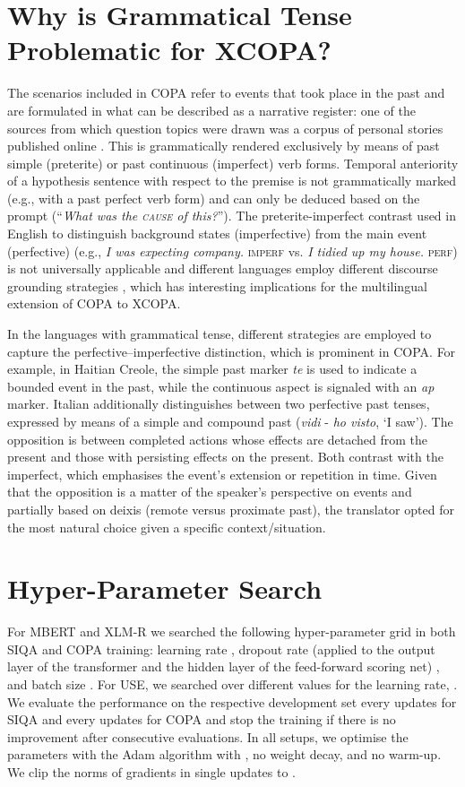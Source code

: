 \documentclass[11pt,a4paper]{article}
\begin{document}
\section{Why is Grammatical Tense Problematic for XCOPA?}
\label{ss:gramtense}
The scenarios included in COPA refer to events that took place in the past and are formulated in what can be described as a narrative register: one of the sources from which question topics were drawn was a corpus of personal stories published online \cite{gordon2009identifying}. This is grammatically rendered exclusively by means of past simple (preterite) or past continuous (imperfect) verb forms. Temporal anteriority of a hypothesis sentence with respect to the premise is not grammatically marked (e.g., with a past perfect verb form) and can only be deduced based on the prompt (``\textit{What was the \textsc{cause} of this?}''). The preterite-imperfect contrast used in English to distinguish background states (imperfective) from the main event (perfective) (e.g., \textit{I was expecting company.} \textsc{imperf} vs. \textit{I tidied up my house.} \textsc{perf}) is not universally applicable and different languages employ different discourse grounding strategies \cite{hopper1979aspect}, which has interesting implications for the multilingual extension of COPA to XCOPA.

In the languages with grammatical tense, different strategies are employed to capture the perfective--imperfective distinction, which is prominent in COPA. For example, in Haitian Creole, the simple past marker \textit{te} is used to indicate a bounded event in the past, while the continuous aspect is signaled with an \textit{ap} marker. Italian additionally distinguishes between two perfective past tenses, expressed by means of a simple and compound past (\textit{vidi} - \textit{ho visto}, `I saw'). The opposition is between completed actions whose effects are detached from the present and those with persisting effects on the present. Both contrast with the imperfect, which emphasises the event's extension or repetition in time. Given that the opposition is a matter of the speaker's perspective on events and partially based on deixis (remote versus proximate past), the translator opted for the most natural choice given a specific context/situation.

\section{Hyper-Parameter Search}
For MBERT and XLM-R we searched the following hyper-parameter grid in both SIQA and COPA training: learning rate , dropout rate (applied to the output layer of the transformer and the hidden layer of the feed-forward scoring net) , and batch size . For USE, we searched over different values for the learning rate, . We evaluate the performance on the respective development set every  updates for SIQA and every  updates for COPA and stop the training if there is no improvement after  consecutive evaluations. In all setups, we optimise the parameters with the Adam algorithm \cite{kingma2015adam} with , no weight decay, and no warm-up. We clip the norms of gradients in single updates to .  
\end{document}
